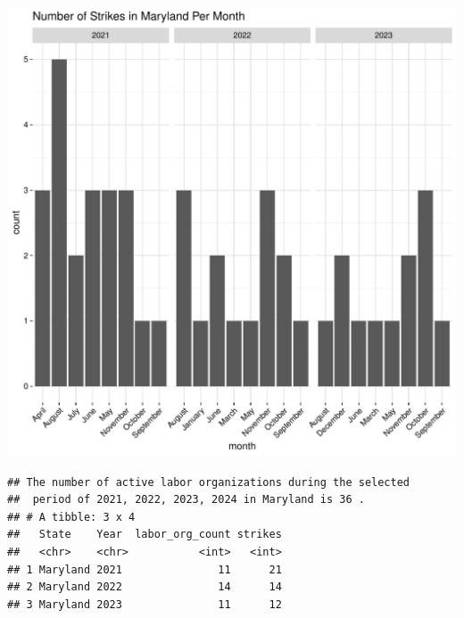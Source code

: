 \documentclass[11pt]{article}\usepackage[]{graphicx}\usepackage[]{xcolor}
\makeatletter
\newenvironment{kframe}{%
 \def\at@end@of@kframe{}%
 \ifinner\ifhmode%
  \def\at@end@of@kframe{\end{minipage}}%
  \begin{minipage}{\columnwidth}%
 \fi\fi%
 \def\FrameCommand##1{\hskip\@totalleftmargin \hskip-\fboxsep
 \colorbox{shadecolor}{##1}\hskip-\fboxsep
     \hskip-\linewidth \hskip-\@totalleftmargin \hskip\columnwidth}%
 \MakeFramed {\advance\hsize-\width
   \@totalleftmargin\z@ \linewidth\hsize
   \@setminipage}}%
 {\par\unskip\endMakeFramed%
 \at@end@of@kframe}
\newenvironment{knitrout}{}{} %
\makeatother
\begin{document}
\begin{knitrout}
\color{fgcolor}

{\centering \includegraphics[width=0.7\linewidth]{figure/calling_the_ggplots_for_Maryland-1} 

}


\begin{kframe}\begin{verbatim}
## The number of active labor organizations during the selected 
##  period of 2021, 2022, 2023, 2024 in Maryland is 36 .
## # A tibble: 3 x 4
##   State    Year  labor_org_count strikes
##   <chr>    <chr>           <int>   <int>
## 1 Maryland 2021               11      21
## 2 Maryland 2022               14      14
## 3 Maryland 2023               11      12
\end{verbatim}
\end{kframe}
\end{knitrout}
\end{document}
